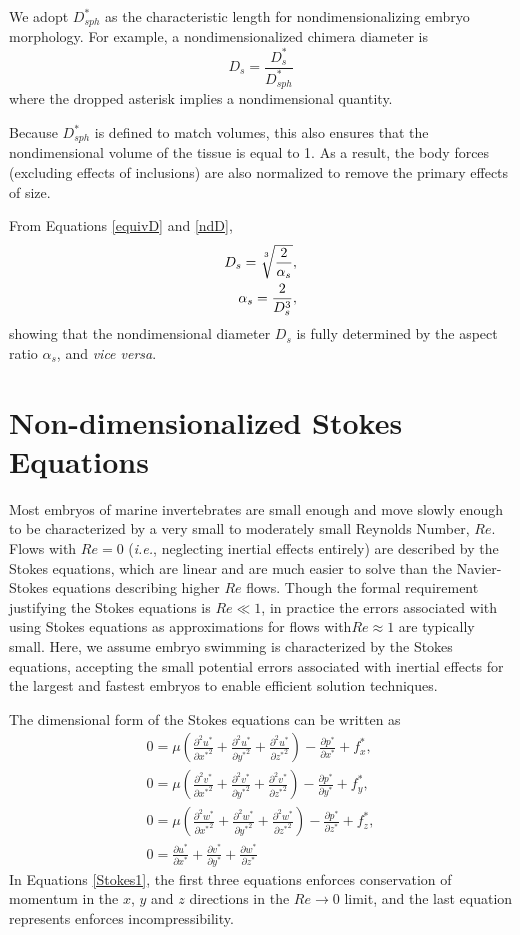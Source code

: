 \documentclass[10pt,a4paper]{article}
\def\non{\nonumber}
\def\p{\partial}
\begin{document}
We adopt $D_{sph}^*$ as the characteristic length for nondimensionalizing embryo morphology.
For example, a nondimensionalized chimera diameter is
\begin{equation}\label{ndD}
	D_s = \frac{D_s^*}{D_{sph}^*}
\end{equation} 
where the dropped asterisk implies a nondimensional quantity.

Because $D_{sph}^*$ is defined to match volumes, this also ensures that the nondimensional volume of the tissue is equal to 1.
As a result, the body forces (excluding effects of inclusions) are also normalized to remove the primary effects of size.

From Equations \ref{equivD} and \ref{ndD},
\begin{eqnarray}\label{equivD2}
	D_s = \sqrt[\uproot{5}3]{\frac{2}{\alpha_s}}, \non \\
	\alpha_s = \frac{2}{D_s^3},
\end{eqnarray}
showing that the nondimensional diameter $D_s$ is fully determined by the aspect ratio $\alpha_s$, and \textit{vice versa}.


\section{Non-dimensionalized Stokes Equations}\label{NDStokesSect}
Most embryos of marine invertebrates are small enough and move slowly enough to be characterized by a very small to moderately small Reynolds Number, $Re$. 
Flows with $Re = 0$ (\textit{i.e.}, neglecting inertial effects entirely) are described by the Stokes equations, which are linear and are much easier to solve than the Navier-Stokes equations describing higher $Re$ flows.
Though the formal requirement justifying the Stokes equations is $Re \ll 1$, in practice the errors associated with using Stokes equations as approximations for flows with$Re \approx 1$ are typically small.
Here, we assume embryo swimming is characterized by the Stokes equations, accepting the small potential errors associated with inertial effects for the largest and fastest embryos to enable efficient solution techniques.

The dimensional form of the Stokes equations can be written as
\begin{eqnarray}\label{Stokes1}
	0 = \mu \left( \frac{\p^2 u^*}{\p {x^*}^2}+\frac{\p^2 u^*}{\p {y^*}^2}+\frac{\p^2 u^*}{\p {z^*}^2} \right) - \frac{\p p^*}{\p {x^*}} + f_x^*, \non \\
	0 = \mu \left( \frac{\p^2 v^*}{\p {x^*}^2}+\frac{\p^2 v^*}{\p {y^*}^2}+\frac{\p^2 v^*}{\p {z^*}^2} \right) - \frac{\p p^*}{\p {y^*}} + f_y^*, \non \\
	0 = \mu \left( \frac{\p^2 w^*}{\p {x^*}^2}+\frac{\p^2 w^*}{\p {y^*}^2}+\frac{\p^2 w^*}{\p {z^*}^2} \right) - \frac{\p p^*}{\p {z^*}} + f_z^*, \non \\
	0 =  \frac{\p u^*}{\p {x^*}}+\frac{\p v^*}{\p {y^*}}+\frac{\p w^*}{\p {z^*}} 
\end{eqnarray}
In Equations \ref{Stokes1}, the first three equations enforces conservation of momentum in the $x$, $y$ and $z$ directions in the $Re \rightarrow 0$ limit, and the last equation represents enforces incompressibility.
\end{document}
